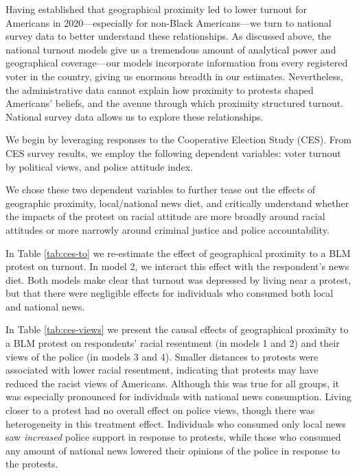 \documentclass[
  12pt,
]{article}
\begin{document}
Having established that geographical proximity led to lower turnout for Americans in 2020---especially for non-Black Americans---we turn to national survey data to better understand these relationships. As discussed above, the national turnout models give us a tremendous amount of analytical power and geographical coverage---our models incorporate information from every registered voter in the country, giving us enormous breadth in our estimates. Nevertheless, the administrative data cannot explain how proximity to protests shaped Americans' beliefs, and the avenue through which proximity structured turnout. National survey data allows us to explore these relationships.

We begin by leveraging responses to the Cooperative Election Study (CES). From CES survey results, we employ the following dependent variables: voter turnout by political views, and police attitude index.

We chose these two dependent variables to further tease out the effects of geographic proximity, local/national news diet, and critically understand whether the impacts of the protest on racial attitude are more broadly around racial attitudes or more narrowly around criminal justice and police accountability.

In Table \ref{tab:ces-to} we re-estimate the effect of geographical proximity to a BLM protest on turnout. In model 2, we interact this effect with the respondent's news diet. Both models make clear that turnout was depressed by living near a protest, but that there were negligible effects for individuals who consumed both local and national news.

\begin{singlespace}

\end{singlespace}

In Table \ref{tab:ces-views} we present the causal effects of geographical proximity to a BLM protest on respondents' racial resentment (in models 1 and 2) and their views of the police (in models 3 and 4). Smaller distances to protests were associated with lower racial resentment, indicating that protests may have reduced the racist views of Americans. Although this was true for all groups, it was especially pronounced for individuals with national news consumption. Living closer to a protest had no overall effect on police views, though there was heterogeneity in this treatment effect. Individuals who consumed only local news saw \emph{increased} police support in response to protests, while those who consumed any amount of national news lowered their opinions of the police in response to the protests.
\end{document}
